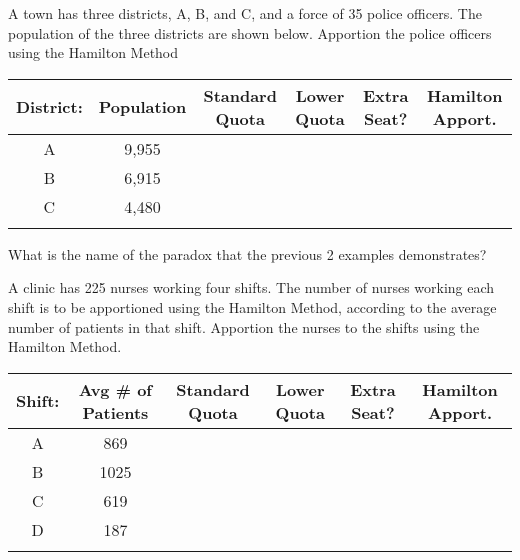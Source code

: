 \documentclass[11pt,epsfig]{article}
\begin{document}
\begin{problem}{10}
A town has three districts, A, B, and C, and a force of 35 police officers. The population of the three districts are shown below. Apportion the police officers using the Hamilton Method
 \begin{center}
 \begin{tabular}{ | c | c | c | c | c | c |}
   \hline
   District: & Population & Standard Quota & Lower Quota & Extra Seat? & Hamilton Apport.\\ \hline
   A & 9,955 &  &  &  &  \\ \hline
   B & 6,915 &  &  &  &  \\ \hline
   C & 4,480 &  &  &  &  \\ \hline
    &  &  &  &  &  \\ \hline
   \end{tabular}
  \end{center}

\vfill
\end{problem}

\begin{problem}{2}
What is the name of the paradox that the previous 2 examples demonstrates?

\vfill
\end{problem}

\newpage

\begin{problem}{10}
A clinic has 225 nurses working four shifts. The number of nurses working each shift is to be apportioned using the Hamilton Method, according to the average number of patients in that shift. Apportion the nurses to the shifts using the Hamilton Method.

 \begin{center}
 \begin{tabular}{ | c | c | c | c | c | c |}
   \hline
   Shift: & Avg \# of Patients & Standard Quota & Lower Quota & Extra Seat? & Hamilton Apport.\\ \hline
   A & 869 &  &  &  &  \\ \hline
   B & 1025 &  &  &  &  \\ \hline
   C & 619 &  &  &  &  \\ \hline
   D & 187 &  &  &  &  \\ \hline
    &  &  &  &  &  \\ \hline
   \end{tabular}
  \end{center}

\vfill
\end{problem}
\end{document}
